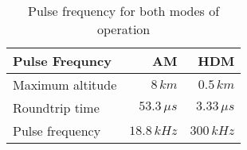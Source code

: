 \begin{table}[H]
\centering
\caption{Pulse frequency for both modes of operation}
\label{tab:f_pulse}
\begin{tabular}{|l|rr|}\hline
    \textbf{Pulse Frequncy} & AM & HDM \\
    \hline 
    Maximum altitude & $8\,km$ & $0.5\,km$ \\
    Roundtrip time & $53.3\,\mu s$ & $3.33\,\mu s$ \\
    Pulse frequency & $18.8\,kHz$ & $300\,kHz$ \\
    \hline 
\end{tabular}
\end{table}
